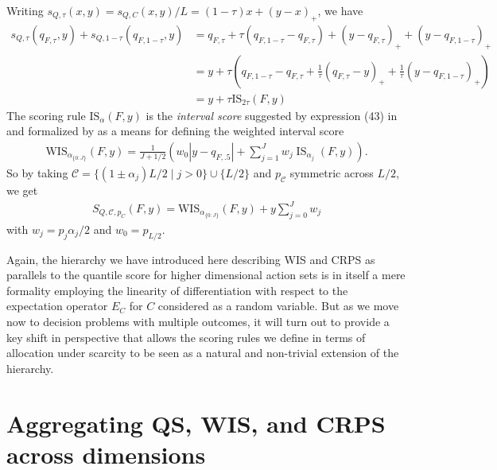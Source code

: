 \documentclass{article}
\begin{document}
Writing $s_{Q,\tau}(x,y) = s_{Q,C}(x,y)/L = (1-\tau)x + (y-x)_{+}$, we have
\begin{align}
s_{Q,\tau}(q_{F,\tau},y) + s_{Q,1-\tau}(q_{F,1-\tau},y) &= q_{F,\tau} + \tau(q_{F,1-\tau} - q_{F,\tau}) + (y - q_{F,\tau})_{+} + (y - q_{F,1-\tau})_{+} \\
&= y + \tau\left(q_{F,1-\tau} - q_{F,\tau} + \frac{1}{\tau}(q_{F,\tau} - y)_{+} + \frac{1}{\tau}(y - q_{F,1-\tau})_{+}\right) \\
&= y + \tau \mathrm{IS}_{2\tau}(F,y)
\end{align}
The scoring rule $\mathrm{IS}_{\alpha}(F,y)$ is the \emph{interval score} suggested by expression (43) in \cite{gneiting2007strictly} 
and formalized by \cite{bracher2021evaluating} as a means for defining the weighted interval score 
\begin{align}
\mathrm{WIS}_{\alpha_{\{0: J\}}}(F, y)=\frac{1}{J+1 / 2}\left(w_0 |y-q_{F,.5}|+\sum_{j=1}^J w_j \operatorname{IS}_{\alpha_j}(F, y)\right).
\end{align}
So by taking $\mathcal{C} = \{(1 \pm \alpha_j)L/2 \mid j > 0\}\cup \{L/2\}$ and $p_\mathcal{C}$ symmetric across $L/2$, we get 
\begin{align}	
S_{Q,\mathcal{C}, p_C}(F,y) = \mathrm{WIS}_{\alpha_{\{0: J\}}}(F, y) + y \sum_{j=0}^{J} w_j
\end{align}	
with $w_j = p_{j}\alpha_j/2$ and $w_0 = p_{L/2}$.


Again, the hierarchy we have introduced here describing WIS and CRPS as parallels to the quantile score for higher dimensional action sets is in itself a mere formality employing the linearity of differentiation with respect to the expectation operator $E_{C}$ for $C$ considered as a random variable. But as we move now to decision problems with multiple outcomes, it will turn out to provide a key shift in perspective that allows the scoring rules we define in terms of allocation under scarcity to be seen as a natural and non-trivial extension of the hierarchy. 


\section{Aggregating QS, WIS, and CRPS across dimensions}
\end{document}
